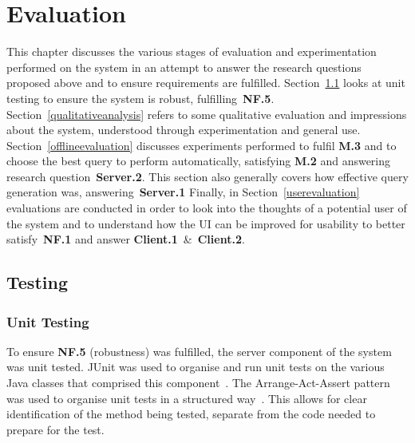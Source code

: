 \documentclass{l4proj}
\begin{document}
\chapter{Evaluation} \label{evaluation}
This chapter discusses the various stages of evaluation and experimentation performed on the system in an attempt to answer the research questions proposed above and to ensure requirements are fulfilled.
Section~\ref{testing} looks at unit testing to ensure the system is robust, fulfilling~\textbf{NF.5}.
Section~\ref{qualitativeanalysis} refers to some qualitative evaluation and impressions about the system, understood through experimentation and general use.
Section~\ref{offlineevaluation} discusses experiments performed to fulfil \textbf{M.3} and to choose the best query to perform automatically, satisfying \textbf{M.2} and answering research question~\textbf{Server.2}. This section also generally covers how effective query generation was, answering~\textbf{Server.1}
Finally, in Section~\ref{userevaluation} evaluations are conducted in order to look into the thoughts of a potential user of the system and to understand how the UI can be improved for usability to better satisfy~\textbf{NF.1} and answer \textbf{Client.1}~\&~\textbf{Client.2}. 

\section{Testing} \label{testing}
\subsection{Unit Testing}
To ensure \textbf{NF.5} (robustness) was fulfilled, the server component of the system was unit tested. JUnit was used to organise and run unit tests on the various Java classes that comprised this component~\cite{junit}.
The Arrange-Act-Assert pattern was used to organise unit tests in a structured way~\cite{grigg2012arrange}. This allows for clear identification of the method being tested, separate from the code needed to prepare for the test.
\end{document}
